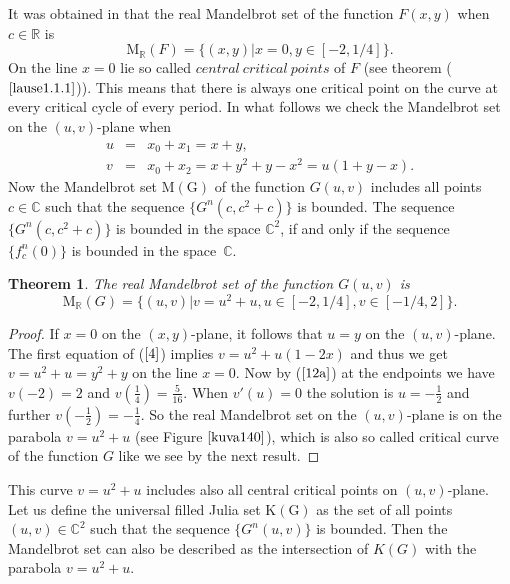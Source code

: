 \documentclass[12pt,a4paper]{amsart}
\newtheorem{lause}{Theorem}
\numberwithin{equation}{section}
\numberwithin{lause}{section}
\begin{document}
It was obtained in \cite{1} that the real Mandelbrot set of the function $F(x,y)$ when $c \in \mathbb{R}$ is
\begin{equation}
 \mathrm{M}_{\mathbb{R}}(F)=\{(x,y)|x=0, y\in[-2,1/4]\}. \label{12a}
\end{equation}
On the line $x=0$ lie so called $\displaystyle{central \ critical \ points}$ of $F$ (see theorem ($\ref{lause1.1.1}$)).
This means that there is always one critical point on the curve at every critical cycle of every period.
In what follows we check the Mandelbrot set on the $(u,v)$-plane when
\begin{eqnarray}
u&=&x_{0}+x_{1}=x+y, \nonumber \\
v&=&x_{0}+x_{2}=x+y^2+y-x^2=u(1+y-x). \nonumber
\end{eqnarray}
Now the Mandelbrot set $\mathrm{M(G)}$ of the function $G(u,v)$ includes all points $c \in \mathbb{C}$ such that the sequence $\{G^{n}(c,c^{2}+c)\}$ is bounded.
 The sequence $\{G^{n}(c,c^{2}+c)\}$ is bounded in the space $\mathbb{C}^{2}$, if and only if the sequence $\{f_{c}^{n}(0)\}$ is bounded in the space~$\mathbb{C}$.
\begin{lause} \label{lause1.1}
The real Mandelbrot set of the function $G(u,v)$ is
 \begin{displaymath}
 \mathrm{M}_{\mathbb{R}}(G)=\{(u,v)|v=u^{2}+u, u\in[-2,1/4], v\in[-1/4,2]\}.
\end{displaymath}
\end{lause}
\begin{proof}
If $x=0$ on the $(x,y)$-plane, it follows that $u=y$ on the $(u,v)$-plane.
The first equation of ($\ref{4}$) implies $v=u^2+u(1-2x)$ and thus we get $v=u^{2}+u=y^{2}+y$ on the line $x=0$.
Now by ($\ref{12a}$) at the endpoints we have $v(-2)=2$ and $v(\frac{1}{4})=\frac{5}{16}$. When $v'(u)=0$ the solution is $u=-\frac{1}{2}$
and further $v(-\frac{1}{2})=-\frac{1}{4}$. So the real Mandelbrot set on the $(u,v)$-plane is on the parabola $v=u^{2}+u$ (see Figure $\ref{kuva140}$), which is also so called critical curve of the function $G$ like we see by the next result.
\end{proof}
This curve $v=u^{2}+u$ includes also all central critical points on $(u,v)$-plane.
Let us define the universal filled Julia set  $\mathrm{K(G)}$ as the set of all points  $(u,v) \in \mathbb{C}^{2}$ such that the sequence $\{G^{n}(u,v)\}$ is bounded.
Then the Mandelbrot set can also be described as the intersection of $K(G)$ with the parabola $v=u^2+u$.
\end{document}
